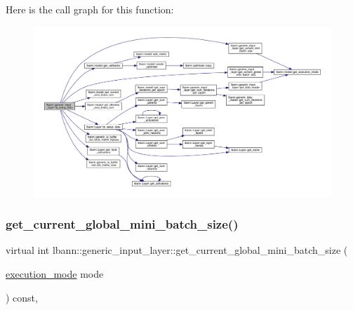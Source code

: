 Here is the call graph for this function\+:\nopagebreak
\begin{figure}[H]
\begin{center}
\leavevmode
\includegraphics[width=350pt]{classlbann_1_1generic__input__layer_ad0b8ea79bc508bd227e08124359531c8_cgraph}
\end{center}
\end{figure}
\mbox{\label{classlbann_1_1generic__input__layer_ae8252d343e2f287dd7cece935ea5a075}} 
\subsubsection{\texorpdfstring{get\+\_\+current\+\_\+global\+\_\+mini\+\_\+batch\+\_\+size()}{get\_current\_global\_mini\_batch\_size()}\hspace{0.1cm}{\footnotesize\ttfamily [1/2]}}
{\footnotesize\ttfamily virtual int lbann\+::generic\+\_\+input\+\_\+layer\+::get\+\_\+current\+\_\+global\+\_\+mini\+\_\+batch\+\_\+size (\begin{DoxyParamCaption}\item[{\hyperlink{base_8hpp_a2781a159088df64ed7d47cc91c4dc0a8}{execution\+\_\+mode}}]{mode }\end{DoxyParamCaption}) const\hspace{0.3cm}{\ttfamily [inline]}, {\ttfamily [virtual]}}



